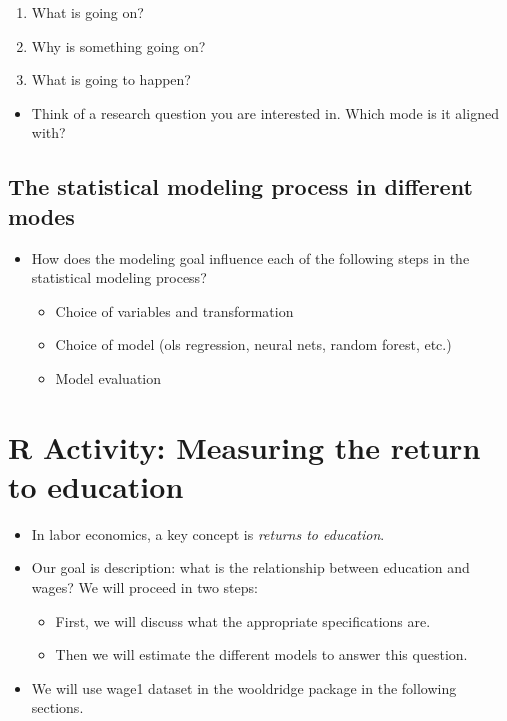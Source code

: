 \documentclass[
]{book}
\providecommand{\tightlist}{%
  \setlength{\itemsep}{0pt}\setlength{\parskip}{0pt}}
\theoremstyle{definition}
\theoremstyle{definition}
\theoremstyle{definition}
\theoremstyle{definition}
\theoremstyle{remark}
\begin{document}
\begin{enumerate}
\def\labelenumi{\arabic{enumi}.}
\tightlist
\item
  What is going on?
\item
  Why is something going on?
\item
  What is going to happen?
\end{enumerate}

\begin{itemize}
\tightlist
\item
  Think of a research question you are interested in. Which mode is it aligned with?
\end{itemize}

\hypertarget{the-statistical-modeling-process-in-different-modes}{%
\subsection{The statistical modeling process in different modes}\label{the-statistical-modeling-process-in-different-modes}}

\begin{itemize}
\item
  How does the modeling goal influence each of the following steps in the statistical modeling process?

  \begin{itemize}
  \item
    Choice of variables and transformation
  \item
    Choice of model (ols regression, neural nets, random forest, etc.)
  \item
    Model evaluation
  \end{itemize}
\end{itemize}

\hypertarget{r-activity-measuring-the-return-to-education}{%
\section{R Activity: Measuring the return to education}\label{r-activity-measuring-the-return-to-education}}

\begin{itemize}
\tightlist
\item
  In labor economics, a key concept is \emph{returns to education}.\\
\item
  Our goal is description: what is the relationship between education and wages? We will proceed in two steps:

  \begin{itemize}
  \tightlist
  \item
    First, we will discuss what the appropriate specifications are.
  \item
    Then we will estimate the different models to answer this question.
  \end{itemize}
\item
  We will use wage1 dataset in the wooldridge package in the following sections.
\end{itemize}
\end{document}
